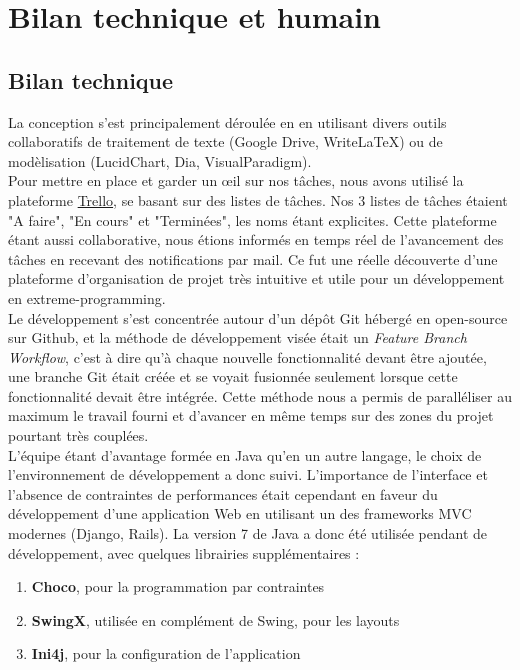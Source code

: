 \documentclass[a4paper]{report}
\begin{document}
\section{Bilan technique et humain}

\subsection{Bilan technique}

La conception s'est principalement déroulée en en utilisant divers outils
collaboratifs de traitement de texte (Google Drive, WriteLaTeX) ou de
modèlisation (LucidChart, Dia, VisualParadigm). \\

Pour mettre en place et garder un œil sur nos tâches, nous avons utilisé la
plateforme \href{https://trello.com/}{Trello}, se basant sur des listes de
tâches. Nos 3 listes de tâches étaient "A faire", "En cours" et "Terminées",
les noms étant explicites. Cette plateforme étant aussi collaborative, nous
étions informés en temps réel de l'avancement des tâches en recevant des
notifications par mail. Ce fut une réelle découverte d'une plateforme
d'organisation de projet très intuitive et utile pour un développement en
extreme-programming. \\

Le développement s'est concentrée autour d'un dépôt Git hébergé
en open-source sur Github, et la méthode de développement visée était un
\emph{Feature Branch Workflow}, c'est à dire qu'à chaque nouvelle
fonctionnalité devant être ajoutée, une branche Git était créée et se voyait
fusionnée seulement lorsque cette fonctionnalité devait être intégrée. Cette
méthode nous a permis de paralléliser au maximum le travail fourni et d'avancer
en même temps sur des zones du projet pourtant très couplées. \\

L'équipe étant d'avantage formée en Java qu'en un autre langage, le choix de
l'environnement de développement a donc suivi. L'importance de l'interface et
l'absence de contraintes de performances était cependant en faveur du
développement d'une application Web en utilisant un des frameworks MVC modernes
(Django, Rails). La version 7 de Java a donc été utilisée pendant de
développement, avec quelques librairies supplémentaires : \\

\begin{enumerate}
    \item \textbf{Choco}, pour la programmation par contraintes
    \item \textbf{SwingX}, utilisée en complément de Swing, pour les layouts
    \item \textbf{Ini4j}, pour la configuration de l'application
\end{enumerate}
\end{document}

